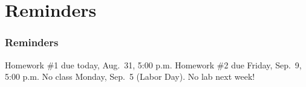 \documentclass[11pt]{beamer}
\begin{document}
\section{Reminders}

\begin{frame}
  \frametitle{Reminders}
  \Enlarge

  \begin{itemize}
  \myitem  Homework \#1 due today, Aug.\ 31, 5:00 p.m.
  \myitem  Homework \#2 due Friday, Sep.\ 9, 5:00 p.m.
  \myitem  No class Monday, Sep.\ 5 (Labor Day).
  \myitem  No lab next week!
  \end{itemize}
\end{frame}
\end{document}
